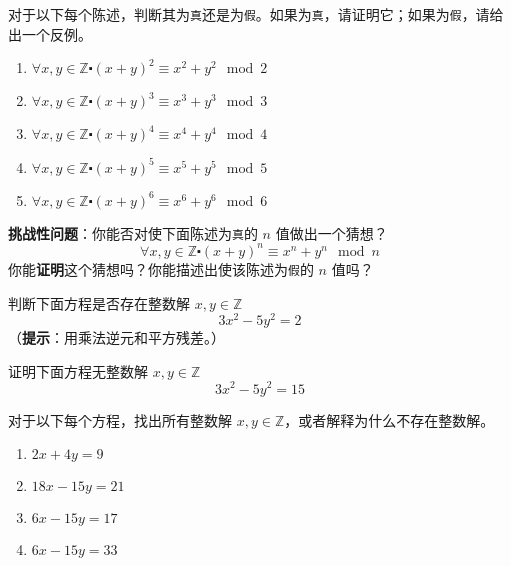 \begin{exercise}\label{exc:exercises6.7.22}
    对于以下每个陈述，判断其为\verb|真|还是为\verb|假|。如果为\verb|真|，请证明它；如果为\verb|假|，请给出一个反例。
    \begin{enumerate}[label=(\alph*)]
        \item $\forall x, y \in \mathbb{Z} \centerdot (x + y)^2 \equiv x^2 + y^2 \mod 2$
        \item $\forall x, y \in \mathbb{Z} \centerdot (x + y)^3 \equiv x^3 + y^3 \mod 3$
        \item $\forall x, y \in \mathbb{Z} \centerdot (x + y)^4 \equiv x^4 + y^4 \mod 4$
        \item $\forall x, y \in \mathbb{Z} \centerdot (x + y)^5 \equiv x^5 + y^5 \mod 5$
        \item $\forall x, y \in \mathbb{Z} \centerdot (x + y)^6 \equiv x^6 + y^6 \mod 6$
    \end{enumerate}
    \textbf{挑战性问题}：你能否对使下面陈述为\verb|真|的 $n$ 值做出一个猜想？
    \[\forall x, y \in \mathbb{Z} \centerdot (x + y)^n \equiv x^n + y^n \mod n\]
    你能\textbf{证明}这个猜想吗？你能描述出使该陈述为\verb|假|的 $n$ 值吗？
\end{exercise}

\begin{exercise}
    判断下面方程是否存在整数解 $x, y \in \mathbb{Z}$
    \[3x^2 - 5y^2 = 2\]
    （\textbf{提示}：用乘法逆元和平方残差。）
\end{exercise}

\begin{exercise}
    证明下面方程无整数解 $x, y \in \mathbb{Z}$
    \[3x^2 - 5y^2 = 15\]
\end{exercise}

\begin{exercise}
    对于以下每个方程，找出所有整数解 $x, y \in \mathbb{Z}$，或者解释为什么不存在整数解。
    \begin{enumerate}[label=(\alph*)]
        \item $2x + 4y = 9$
        \item $18x - 15y = 21$
        \item $6x - 15y = 17$
        \item $ 6x - 15y = 33$
    \end{enumerate}
\end{exercise}

